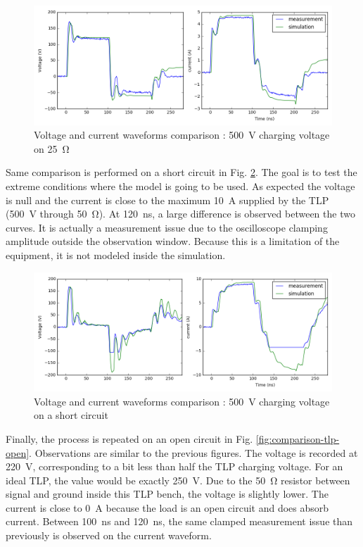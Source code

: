 \begin{figure}[!h]
  \centering
  \includegraphics[width=\textwidth]{src/2/figures/tlp_comparison_R25_500V.png}
  \caption{Voltage and current waveforms comparison : \SI{500}{\volt} charging voltage on \SI{25}{\ohm}}
  \label{fig:comparison-tlp-load}
\end{figure}

Same comparison is performed on a short circuit in Fig. \ref{fig:comparison-tlp-short}.
The goal is to test the extreme conditions where the model is going to be used.
As expected the voltage is null and the current is close to the maximum \SI{10}{\ampere} supplied by the TLP (\SI{500}{\volt} through \SI{50}{\ohm}).
At \SI{120}{\nano\second}, a large difference is observed between the two curves.
It is actually a measurement issue due to the oscilloscope clamping amplitude outside the observation window.
Because this is a limitation of the equipment, it is not modeled inside the simulation.

\begin{figure}[!h]
  \centering
  \includegraphics[width=\textwidth]{src/2/figures/tlp_comparison_short_500V.png}
  \caption{Voltage and current waveforms comparison : \SI{500}{\volt} charging voltage on a short circuit}
  \label{fig:comparison-tlp-short}
\end{figure}

Finally, the process is repeated on an open circuit in Fig. \ref{fig:comparison-tlp-open}.
Observations are similar to the previous figures.
The voltage is recorded at \SI{220}{\volt}, corresponding to a bit less than half the TLP charging voltage.
For an ideal TLP, the value would be exactly \SI{250}{\volt}.
Due to the \SI{50}{\ohm} resistor between signal and ground inside this TLP bench, the voltage is slightly lower.
The current is close to \SI{0}{\ampere} because the load is an open circuit and does absorb current.
Between \SI{100}{\nano\second} and \SI{120}{\nano\second}, the same clamped measurement issue than previously is observed on the current waveform.


